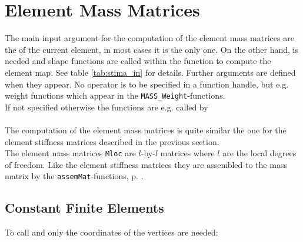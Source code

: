 
\section{Element Mass Matrices} \label{sect:mass} 

 The main input argument for the computation of the element mass matrices are the  of the current element, in most cases it is the only one. On the other hand,  is needed and shape functions are called within the function to compute the element map. See table \ref{tab:stima_in} for details. Further arguments are defined when they appear. No operator is to be specified in a function handle, but e.g. weight functions which appear in the {\tt MASS\_Weight}-functions. \\

 If not specified otherwise the functions are e.g. called by \\

 \\

 The computation of the element mass matrices  is quite similar the one for the element stiffness matrices  described in the previous section. \\

 The element mass matrices {\tt Mloc} are $l$-by-$l$ matrices where $l$ are the local degrees of freedom. Like the element stiffness matrices they are assembled to the mass matrix  by the {\tt assemMat}-functions, p. \pageref{sect:assem_mat}.



\subsection{Constant Finite Elements} 

 To call  and  only the coordinates of the vertices are needed: \\

 \\
 \\

